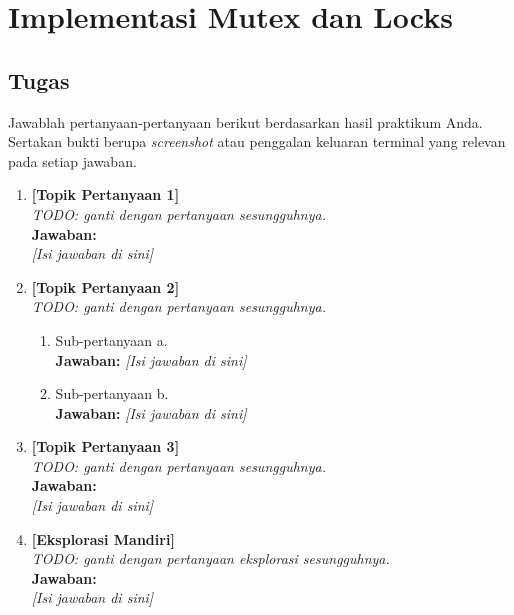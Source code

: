 
\chapter{Implementasi Mutex dan Locks}
\label{chap:handson-05}

\section{Tugas}

Jawablah pertanyaan-pertanyaan berikut berdasarkan hasil praktikum Anda.
Sertakan bukti berupa \textit{screenshot} atau penggalan keluaran terminal
yang relevan pada setiap jawaban.

\begin{enumerate}
    \item \textbf{[Topik Pertanyaan 1]}\\
    \textit{TODO: ganti dengan pertanyaan sesungguhnya.}\\[0.3cm]
    \textbf{Jawaban:}\\
    \textit{[Isi jawaban di sini]}

    \item \textbf{[Topik Pertanyaan 2]}\\
    \textit{TODO: ganti dengan pertanyaan sesungguhnya.}
    \begin{enumerate}
        \item[(a)] Sub-pertanyaan a.\\
        \textbf{Jawaban:} \textit{[Isi jawaban di sini]}
        \item[(b)] Sub-pertanyaan b.\\
        \textbf{Jawaban:} \textit{[Isi jawaban di sini]}
    \end{enumerate}

    \item \textbf{[Topik Pertanyaan 3]}\\
    \textit{TODO: ganti dengan pertanyaan sesungguhnya.}\\[0.3cm]
    \textbf{Jawaban:}\\
    \textit{[Isi jawaban di sini]}

    \item \textbf{[Eksplorasi Mandiri]}\\
    \textit{TODO: ganti dengan pertanyaan eksplorasi sesungguhnya.}\\[0.3cm]
    \textbf{Jawaban:}\\
    \textit{[Isi jawaban di sini]}
\end{enumerate}